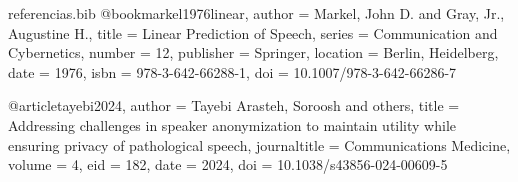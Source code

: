 \begin{filecontents}{referencias.bib}
@book{markel1976linear,
  author    = {Markel, John D. and Gray, Jr., Augustine H.},
  title     = {Linear Prediction of Speech},
  series    = {Communication and Cybernetics},
  number    = {12},
  publisher = {Springer},
  location  = {Berlin, Heidelberg},
  date      = {1976},
  isbn      = {978-3-642-66288-1},
  doi       = {10.1007/978-3-642-66286-7}
}

@article{tayebi2024,
  author       = {Tayebi Arasteh, Soroosh and others},
  title        = {Addressing challenges in speaker anonymization to maintain utility while ensuring privacy of pathological speech},
  journaltitle = {Communications Medicine},
  volume       = {4},
  eid          = {182},
  date         = {2024},
  doi          = {10.1038/s43856-024-00609-5}
}
\end{filecontents}

\documentclass[10pt,twocolumn]{article}

\usepackage[utf8]{inputenc}
\usepackage[T1]{fontenc}
\usepackage[spanish,es-noshorthands]{babel}
\addto\captionsspanish{\renewcommand{\tablename}{Tabla}}
\usepackage{amsmath}                 %
\usepackage{newtxtext,newtxmath}
\usepackage{microtype}
\usepackage{csquotes}

\usepackage[letterpaper,margin=2.2cm,columnsep=0.8cm]{geometry}
\usepackage{titlesec}
\usepackage{booktabs,tabularx,array}
\usepackage{xcolor}
\usepackage{enumitem}

\setlength{\parindent}{1.2em}

\titleformat{\section}{\Large\bfseries}{\thesection}{0.6em}{}
\titleformat{\subsection}{\large\bfseries\itshape}{\thesubsection}{0.6em}{}


